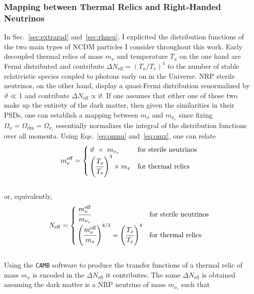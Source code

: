 \subsubsection{Mapping between Thermal Relics and Right-Handed Neutrinos}

In Sec.~\ref{sec:extrarad} and~\ref{sec:rhneu}, I explicited the distribution functions of the two main types of NCDM particles I consider throughout this work. Early decoupled thermal relics of mass $m_x$ and temperature $T_x$ on the one hand are Fermi distributed and contribute $\Delta N_\mathrm{eff} = (T_x/T_\nu)^4$ to the number of stable relativistic species coupled to photons early on in the Universe. NRP sterile neutrinos, on the other hand, display a quasi-Fermi distribution renormalized by $\vartheta \ll 1$ and contribute $\Delta N_{\mathrm{eff}} \propto \vartheta$. If one assumes that either one of those two make up the entirety of the dark matter, then given the similarities in their PSDs, one can establish a mapping between $m_x$ and $m_{\nu_s}$ since fixing $\Omega_x = \Omega_{\mathrm{dm}} = \Omega_{\nu_s}$ essentially normalizes the integral of the distribution functions over all momenta. Using Eqs.~\ref{eq:omnu} and~\ref{eq:omx}, one can relate \\
\begin{equation}
m^{\mathrm{eff}}_\nu = \begin{cases}
\vartheta ~\times~ m_{\nu_s} & \text{for sterile neutrinos}\\
\left( \cfrac{T_x}{T_\nu} \right)^3 \times m_x & \text{for thermal relics}
\end{cases}
\end{equation} \\ or, equivalently,\\
\begin{equation}
\label{eq:neff_whether}
N_{\mathrm{eff}} = \begin{cases}
\cfrac{m_\nu^\mathrm{eff}}{m_{\nu_s}} & \text{for sterile neutrinos}\\
\left( \cfrac{m_\nu^\mathrm{eff}}{m_x} \right) ^{4/3} = \left( \cfrac{T_x}{T_\nu} \right)^4 & \text{for thermal relics}
\end{cases}
\end{equation} \\ Using the \texttt{CAMB} software to produce the transfer functions of a thermal relic of mass $m_x$ is encoded in the $\Delta N_\mathrm{eff}$ it contributes. The same $\Delta N_\mathrm{eff}$ is obtained assuming the dark matter is a NRP neutrino of mass $m_{\nu_s}$ such that \\
